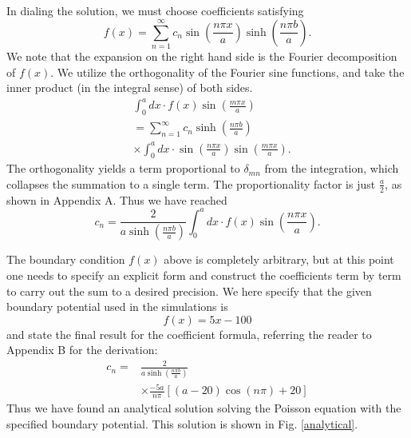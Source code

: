 \documentclass[reprint, amsmath, amssymb, aps, floatfix]{revtex4-1}
\begin{document}
In dialing the solution, we must choose coefficients satisfying \begin{equation}
f(x)=\sum_{n=1}^\infty c_n \sin\left(\frac{n\pi x}{a}\right)\sinh\left(\frac{n\pi b}{a}\right). \label{feq}\end{equation} We note that the expansion on the right hand side is the Fourier decomposition of $f(x)$. We utilize the orthogonality of the Fourier sine functions, and take the inner product (in the integral sense) of both sides. \begin{equation}
\begin{aligned}
&\int_{0}^{a}dx\cdot f(x)\sin\left(\frac{m\pi x}{a}\right)\\&= \sum_{n=1}^\infty c_n \sinh\left(\frac{n\pi b}{a}\right)\\&\times\int_0^a dx\cdot \sin\left(\frac{n\pi x}{a}\right)\sin\left(\frac{m \pi x}{a}\right).
\end{aligned}
\end{equation} The orthogonality yields a term proportional to $\delta_{mn}$ from the integration, which collapses the summation to a single term. The proportionality factor is just $\frac{a}{2}$, as shown in Appendix A. Thus we have reached \begin{equation}
c_n = \frac{2}{a\sinh\left(\frac{n\pi b}{a}\right)} \int_{0}^{a} dx\cdot f(x)\sin\left(\frac{n\pi x}{a}\right). \label{constant}
\end{equation}

The boundary condition $f(x)$ above is completely arbitrary, but at this point one needs to specify an explicit form and construct the coefficients term by term to carry out the sum to a desired precision. We here specify that the given boundary potential used in the simulations is \begin{equation}
f(x)=5x-100 \label{fofx}
\end{equation} and state the final result for the coefficient formula, referring the reader to Appendix B for the derivation: \begin{equation}
\begin{aligned}
c_n =& \frac{2}{a\sinh\left(\frac{n\pi b}{a}\right)}\\& \times\frac{-5a}{n\pi}\left[(a-20)\cos(n\pi)+20\right]
\label{finalceq}
\end{aligned}
\end{equation} Thus we have found an analytical solution solving the Poisson equation with the specified boundary potential. This solution is shown in Fig. \ref{analytical}.
\end{document}
